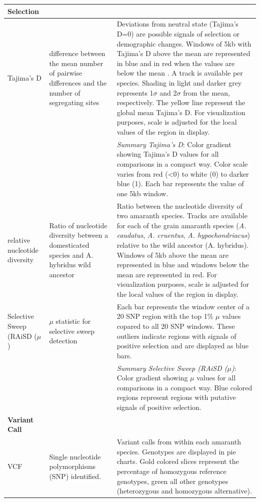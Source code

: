 \documentclass[9pt,twocolumn,twoside]{celabRxiv}
\begin{document}
\begin{longtable}{p{3cm}p{6cm}p{8cm}}
\textbf{Selection} & & \\ 
\hline 
Tajima's D & difference between the mean number of pairwise differences and the number of segregating sites \cite{tajima1989statistical} & Deviations from neutral state (Tajima's D=0) are possible signals of selection or demographic changes. 
Windows of 5kb with Tajima's D above the mean are represented in blue and in red when the values are below the mean . A track is available per species. Shading in light and darker grey represents 1$\sigma$ and 2$\sigma$ from the mean, respectively. The yellow line represent the global mean Tajima's D. For visualization purposes, scale is adjusted for the local values of the region in display.\\
& & 	\textit{Summary Tajima's D}: Color gradient showing Tajima's D values for all comparisons in a compact way. Color scale varies from red (<0) to white (0) to darker blue (1). Each bar represents the value of one 5kb window. \\
relative nucleotide diversity & Ratio of nucleotide diversity between a domesticated species and A. hybridus wild ancestor & Ratio between the nucleotide diversity of two amaranth species. Tracks are available for each of the grain amaranth species (\textit{A. caudatus}, \textit{A. cruentus}, \textit{A. hypochondriacus}) relative to the wild ancestor (A. hybridus). Windows of 5kb above the mean are represented in blue and windows below the mean are represented in red. For visualization purposes, scale is adjusted for the local values of the region in display. \\ 
 
Selective Sweep (RAiSD ($\mu$) & $\mu$ statistic for selective sweep detection & Each bar represents the window center of a 20 SNP region with the top 1\% $\mu$ values copared to all 20 SNP windows. These outliers indicate regions with signals of positive selection and are displayed as blue bars.\\
& & 	\textit{Summary Selective Sweep (RAiSD ($\mu$)}: Color gradient showing $\mu$ values for all comparisons in a compact way. Blue colored regions represent regions with putative signals of positive selection.\\
\textbf{Variant Call} & &\\
\hline
VCF & Single nucleotide polymorphisms (SNP) identified.& Variant calls from \citet{stetter2020parallel} within each amaranth species. Genotypes are displayed in pie charts. Gold colored slices represent the percentage of homozygous reference genotypes, green all other genotypes (heterozygous and homozygous alternative).\\ 

\end{longtable}
\end{document}
